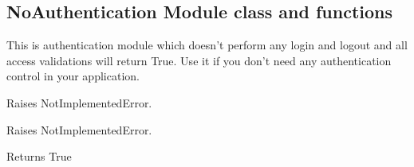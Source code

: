 \documentclass[letterpaper,10pt,english]{sphinxmanual}
\begin{document}
\subsection{NoAuthentication Module class and functions}
\label{sysmod:noauthentication-module-class-and-functions}\label{sysmod:module-pyfrid.modules.system.auth.noauth}

\begin{fulllineitems}
\label{sysmod:pyfrid.modules.system.auth.noauth.BaseNoAuthModule}
This is authentication module which doesn't perform any login and logout and all access validations will return True.
Use it if you don't need any authentication control in your application.

\begin{fulllineitems}
\label{sysmod:pyfrid.modules.system.auth.noauth.BaseNoAuthModule.add_user}
Raises NotImplementedError.

\end{fulllineitems}


\begin{fulllineitems}
\label{sysmod:pyfrid.modules.system.auth.noauth.BaseNoAuthModule.del_user}
Raises NotImplementedError.

\end{fulllineitems}


\begin{fulllineitems}
\label{sysmod:pyfrid.modules.system.auth.noauth.BaseNoAuthModule.noauth}
Returns True

\end{fulllineitems}



\end{fulllineitems}
\end{document}
